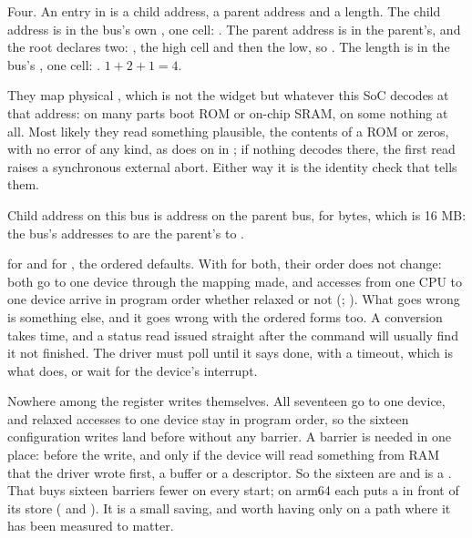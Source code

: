  Four. An entry in  is a child address, a parent address and a length. The
child address is in the bus's own , one cell: . The parent address is
in the parent's, and the root declares two: , the high cell and then the low,
so . The length is in the bus's , one cell: .
$1 + 2 + 1 = 4$.

 They map physical , which is not the widget but whatever this SoC decodes at
that address: on many parts boot ROM or on-chip SRAM, on some nothing at all. Most likely they read
something plausible, the contents of a ROM or zeros, with no error of any kind, as 
does on  in ; if nothing decodes there, the first read raises a
synchronous external abort. Either way it is the identity check that tells them.

 Child address  on this bus is address  on the parent bus, for
 bytes, which is 16 MB: the bus's addresses  to  are the
parent's  to .


  for  and  for , the ordered defaults.
With  for both, their order does not change: both go to one device through the
mapping  made, and accesses from one CPU to one device arrive in program order
whether relaxed or not (; ). What goes
wrong is something else, and it goes wrong with the ordered forms too. A conversion takes time, and
a status read issued straight after the command will usually find it not finished. The driver must
poll  until it says done, with a timeout, which is what  does,
or wait for the device's interrupt.

 Nowhere among the register writes themselves. All seventeen go to one device, and relaxed
accesses to one device stay in program order, so the sixteen configuration writes land before
 without any barrier. A barrier is needed in one place: before the  write, and
only if the device will read something from RAM that the driver wrote first, a buffer or a
descriptor. So the sixteen are  and  is a . That buys
sixteen barriers fewer on every start; on arm64 each  puts a  in front
of its store ( and ). It is a small saving, and
worth having only on a path where it has been measured to matter.

